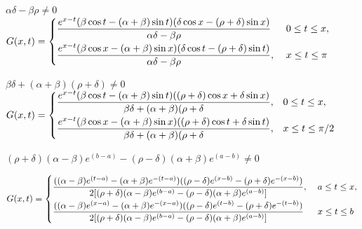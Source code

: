 \smallskip
{} $\alpha\delta-\beta\rho\ne0$ \;
$G(x,t)=
\begin{cases}
\displaystyle{\frac{e^{x-t}(\beta\cos t-(\alpha+\beta)\sin t)
(\delta\cos x-(\rho+\delta)\sin x)}{\alpha\delta-\beta\rho}}\;
&0\le t\le x,\\[.11in]
\displaystyle{\frac{e^{x-t}(\beta\cos x-(\alpha+\beta)\sin x)
(\delta\cos t-(\rho+\delta)\sin t)}{\alpha\delta-\beta\rho}},\;
&x\le t\le\pi
\end{cases}$

\smallskip
{} $\beta\delta+(\alpha+\beta)(\rho+\delta)\ne0$ \;
$G(x,t)=
\begin{cases}
\displaystyle{\frac{e^{x-t}(\beta\cos t-(\alpha+\beta)\sin t)
((\rho+\delta)\cos x+\delta\sin x)}{\beta\delta+(\alpha+\beta)(\rho+\delta}},&0\le t\le  x,\\[.11in]
\displaystyle{\frac{e^{x-t}(\beta\cos x-(\alpha+\beta)\sin x)
((\rho+\delta)\cos t+\delta\sin t)}{\beta\delta+(\alpha+\beta)(\rho+\delta}},&x\le t\le\pi/2
\end{cases}$

\smallskip
{}
$(\rho+\delta)(\alpha-\beta)e^{(b-a)}-(\rho-\delta)(\alpha+\beta)e^{(a-b)}\ne0$

\smallskip
\quad \quad
$G(x,t)=
\begin{cases}
\displaystyle{\frac{((\alpha-\beta)e^{(t-a)}-(\alpha+\beta)e^{-(t-a)})
((\rho-\delta)e^{(x-b)}-(\rho+\delta)e^{-(x-b)})}{2[(\rho+\delta)(\alpha-\beta)e^{(b-a)}-(\rho-\delta)(\alpha+\beta)e^{(a-b)}]}},\;
&a\le t\le x,\\[.11in]
\displaystyle{\frac{((\alpha-\beta)e^{(x-a)}-(\alpha+\beta)e^{-(x-a)})
((\rho-\delta)e^{(t-b)}-(\rho+\delta)e^{-(t-b)})}{2[(\rho+\delta)(\alpha-\beta)e^{(b-a)}-(\rho-\delta)(\alpha+\beta)e^{(a-b)}]}}\;
&x\le t\le b
\end{cases}$


